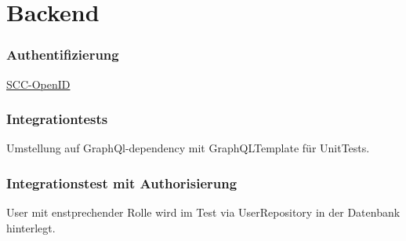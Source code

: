 \section{Backend}


    \begin{frame}\frametitle{Authentifizierung}
        \href{https://www.scc.kit.edu/dienste/openid-connect.php}{SCC-OpenID}
    \end{frame}

    \begin{frame}\frametitle{Integrationtests}
        Umstellung auf GraphQl-dependency mit GraphQLTemplate für UnitTests. 
    \end{frame}

    \begin{frame}\frametitle{Integrationstest mit Authorisierung}
        User mit enstprechender Rolle wird im Test via UserRepository in der Datenbank hinterlegt.
    \end{frame}

    \begin{frame}
    \end{frame}
